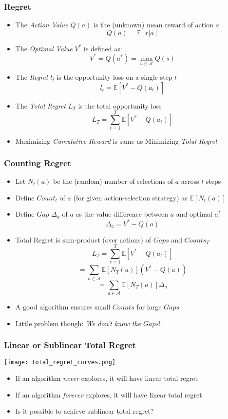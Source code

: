 \documentclass[handout]{beamer}
\begin{document}
\begin{frame}
\frametitle{Regret}
\pause
\begin{itemize}[<+->]
\item The {\em Action Value} $Q(a)$ is the (unknown) mean reward of action $a$
$$Q(a) = \mathbb{E}[r|a]$$
\item The {\em Optimal Value} $V^*$ is defined as:
$$V^* = Q(a^*) = \max_{a\in\mathcal{A}} Q(s)$$
\item The {\em Regret} $l_t$ is the opportunity loss on a single step $t$
$$l_t = \mathbb{E}[V^* - Q(a_t)]$$
\item The {\em Total Regret} $L_T$ is the total opportunity loss
$$L_T = \sum_{t=1}^T \mathbb{E}[V^* - Q(a_t)]$$
\item Maximizing {\em Cumulative Reward} is same as Minimizing {\em Total Regret}
\end{itemize}
\end{frame}

\begin{frame}
\frametitle{Counting Regret}
\pause
\begin{itemize}[<+->]
\item Let $N_t(a)$ be the (random) number of selections of $a$ across $t$ steps
\item Define $Count_t$ of $a$ (for given action-selection strategy) as $\mathbb{E}[N_t(a)]$
\item Define $Gap$ $\Delta_a$ of $a$ as the value difference between $a$ and optimal $a^*$
$$\Delta_a = V^* - Q(a) $$
\item Total Regret is sum-product (over actions) of $Gaps$ and $Counts_T$
$$L_T = \sum_{t=1}^T \mathbb{E}[V^* - Q(a_t)]$$
$$ = \sum_{a\in\mathcal{A}} \mathbb{E}[N_T(a)] (V^* - Q(a))$$
$$ = \sum_{a\in\mathcal{A}} \mathbb{E}[N_T(a)] \Delta_a$$
\item A good algorithm ensures small $Counts$ for large $Gaps$
\item Little problem though: {\em We don't know the $Gaps$}!
\end{itemize}
\end{frame}

\begin{frame}
\frametitle{Linear or Sublinear Total Regret}
\texttt{[image: total\_regret\_curves.png]}
\begin{itemize}
\item If an algorithm {\em never} explores, it will have linear total regret
\item If an algorithm {\em forever} explores, it will have linear total regret
\item Is it possible to achieve sublinear total regret?
\end{itemize}
\end{frame}
\end{document}
